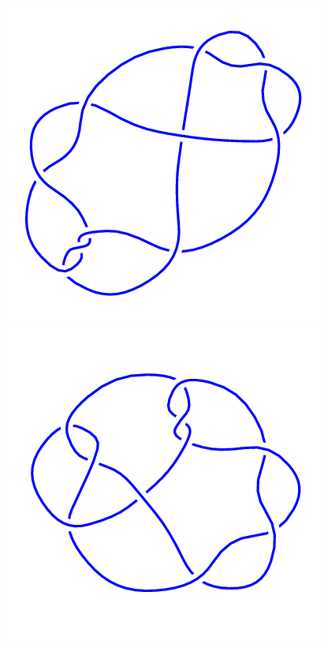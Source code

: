 \begin{figure}[H]
	\begin{minipage}[b]{.18\linewidth}
		\centering
		\includegraphics[width=\linewidth]{../data/10_22.png}
	\end{minipage}
	\begin{minipage}[b]{.18\linewidth}
		\centering
		\includegraphics[width=\linewidth]{../data/10_23.png}

\end{minipage}
\end{figure}
